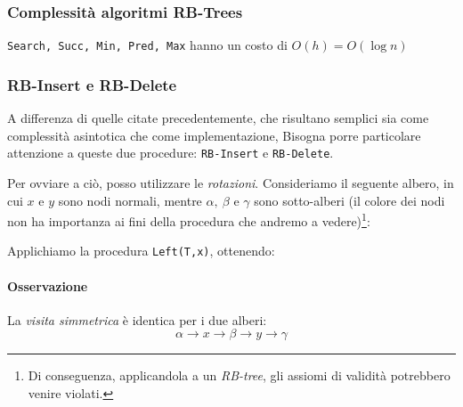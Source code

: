 \subsubsection{Complessità algoritmi RB-Trees}
\texttt{Search, Succ, Min, Pred, Max} hanno un costo di $O(h) = O(\log n)$


\subsubsection{RB-Insert e RB-Delete}
A differenza di quelle citate precedentemente, che risultano semplici
sia come complessità asintotica che come implementazione, Bisogna porre 
particolare attenzione a queste due procedure: \texttt{RB-Insert} e \texttt{RB-Delete}.

Per ovviare a ciò, posso utilizzare le \emph{rotazioni}. Consideriamo il seguente albero,
in cui $x$ e $y$ sono nodi normali, mentre $\alpha, \ \beta$ e $\gamma$ sono sotto-alberi
(il colore dei nodi non ha importanza ai fini della procedura che andremo a 
vedere)\footnote{Di conseguenza, applicandola a un \emph{RB-tree}, gli assiomi di validità potrebbero venire violati.}:
\begin{center}
\end{center}
Applichiamo la procedura \texttt{Left(T,x)}, ottenendo:
\begin{center}
\end{center}

\paragraph{Osservazione} La \emph{visita simmetrica} è identica per i due alberi:
$$\alpha \rightarrow x \rightarrow \beta \rightarrow y \rightarrow \gamma$$


